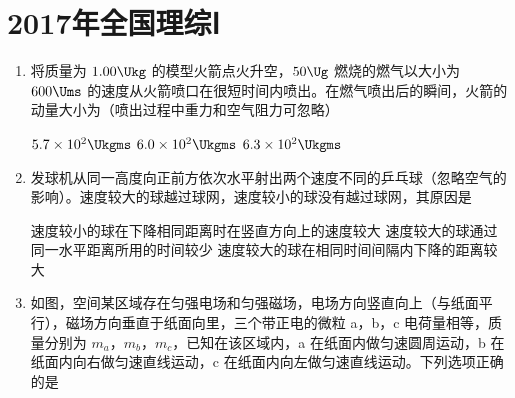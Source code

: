 \documentclass[\gkver]{gaokaozhenti}
\begin{document}
\chapter{2017年全国理综Ⅰ}

\begin{enumerate}
\item
将质量为 $1.00\Ukg$ 的模型火箭点火升空，$50\Ug$ 燃烧的燃气以大小为 $600\Ums$ 的速度从火箭喷口在很短时间内喷出。在燃气喷出后的瞬间，火箭的动量大小为（喷出过程中重力和空气阻力可忽略）

\fourchoices[answer=A]
{$30\Ukgms$}
{$5.7\times10^{2}\Ukgms$}
{$6.0\times10^{2}\Ukgms$}
{$6.3\times10^{2}\Ukgms$}


\item
发球机从同一高度向正前方依次水平射出两个速度不同的乒乓球（忽略空气的影响）。速度较大的球越过球网，速度较小的球没有越过球网，其原因是

{速度较小的球在下降相同距离时在竖直方向上的速度较大}
{速度较大的球通过同一水平距离所用的时间较少}
{速度较大的球在相同时间间隔内下降的距离较大}


\item
如图，空间某区域存在匀强电场和匀强磁场，电场方向竖直向上（与纸面平行），磁场方向垂直于纸面向里，三个带正电的微粒 a，b，c 电荷量相等，质量分别为 $m_{a}$，$m_{b}$，$m_{c}$，已知在该区域内，a 在纸面内做匀速圆周运动，b 在纸面内向右做匀速直线运动，c 在纸面内向左做匀速直线运动。下列选项正确的是


\end{enumerate}
\end{document}
